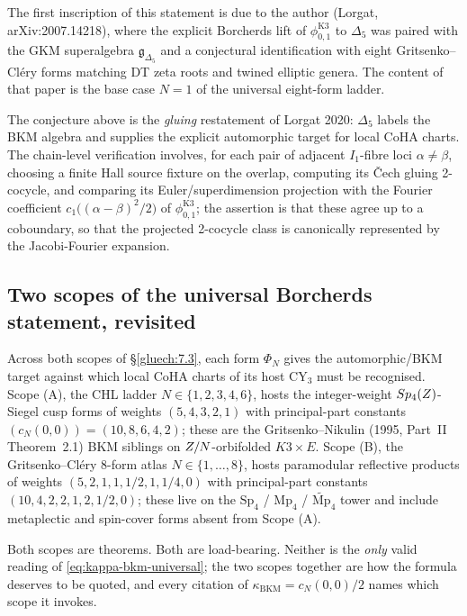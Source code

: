 The first inscription of this statement is due to the author (Lorgat, arXiv:2007.14218), where the explicit Borcherds lift of $\phi_{0, 1}^{\mathrm{K3}}$ to $\Delta_5$ was paired with the GKM superalgebra $\mathfrak g_{\Delta_5}$ and a conjectural identification with eight Gritsenko--Cl\'ery forms matching DT zeta roots and twined elliptic genera. The content of that paper is the base case $N = 1$ of the universal eight-form ladder.

The conjecture above is the \emph{gluing} restatement of Lorgat 2020: $\Delta_5$ labels the BKM algebra and supplies the explicit automorphic target for local CoHA charts. The chain-level verification involves, for each pair of adjacent $I_1$-fibre loci $\alpha \neq \beta$, choosing a finite Hall source fixture on the overlap, computing its Čech gluing 2-cocycle, and comparing its Euler/superdimension projection with the Fourier coefficient $c_1\bigl((\alpha - \beta)^2/2\bigr)$ of $\phi_{0, 1}^{\mathrm{K3}}$; the assertion is that these agree up to a coboundary, so that the projected 2-cocycle class is canonically represented by the Jacobi-Fourier expansion.

\subsection{Two scopes of the universal Borcherds statement, revisited}

Across both scopes of \S\ref{gluech:7.3}, each form $\Phi_N$ gives the automorphic/BKM target against which local CoHA charts of its host CY$_3$ must be recognised. Scope (A), the CHL ladder $N \in \{1, 2, 3, 4, 6\}$, hosts the integer-weight $Sp_4(Z)$-Siegel cusp forms of weights $(5, 4, 3, 2, 1)$ with principal-part constants $(c_N(0, 0)) = (10, 8, 6, 4, 2)$; these are the Gritsenko--Nikulin (1995, Part~II Theorem~2.1) BKM siblings on $Z/N$-orbifolded $K3 \times E$. Scope (B), the Gritsenko--Cl\'ery 8-form atlas $N \in \{1, \ldots, 8\}$, hosts paramodular reflective products of weights $(5, 2, 1, 1, 1/2, 1, 1/4, 0)$ with principal-part constants $(10, 4, 2, 2, 1, 2, 1/2, 0)$; these live on the $\mathrm{Sp}_4$ / $\mathrm{Mp}_4$ / $\widetilde{\mathrm{Mp}}_4$ tower and include metaplectic and spin-cover forms absent from Scope (A).

Both scopes are theorems. Both are load-bearing. Neither is the \emph{only} valid reading of \eqref{eq:kappa-bkm-universal}; the two scopes together are how the formula deserves to be quoted, and every citation of $\kappa_{\mathrm{BKM}} = c_N(0, 0)/2$ names which scope it invokes.

